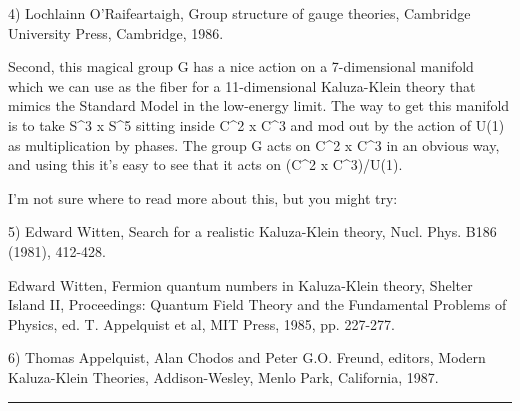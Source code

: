 4) Lochlainn O'Raifeartaigh, Group structure of gauge theories, 
Cambridge University Press, Cambridge, 1986.

Second, this magical group G has a nice action on a 7-dimensional 
manifold which we can use as the fiber for a 11-dimensional Kaluza-Klein 
theory that mimics the Standard Model in the low-energy limit.  The way 
to get this manifold is to take S^3 x S^5 sitting inside C^2 x C^3 and 
mod out by the action of U(1) as multiplication by phases.  The group 
G acts on C^2 x C^3 in an obvious way, and using this it's easy to see 
that it acts on (C^2 x C^3)/U(1).  

I'm not sure where to read more about this, but you might try:

5) Edward Witten, Search for a realistic Kaluza-Klein theory, 
Nucl. Phys. B186 (1981), 412-428.

Edward Witten, Fermion quantum numbers in Kaluza-Klein theory, 
Shelter Island II, Proceedings: Quantum Field Theory and the 
Fundamental Problems of Physics, ed. T. Appelquist et al, 
MIT Press, 1985, pp. 227-277.


6) Thomas Appelquist, Alan Chodos and Peter G.O. Freund, editors,
Modern Kaluza-Klein Theories, Addison-Wesley, Menlo Park, California,
1987.


 \par\noindent\rule{\textwidth}{0.4pt}

